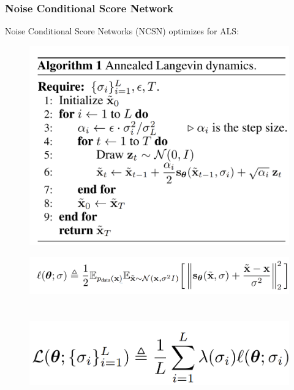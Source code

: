 \documentclass{beamer}
\begin{document}
\begin{frame}
    \frametitle{Noise Conditional Score Network}
    Noise Conditional Score Networks (NCSN) optimizes for ALS:
    \begin{figure}
        \centering
        \begin{minipage}{0.45\textwidth}
            \centering
            \includegraphics[width=1.2\textwidth]{images/ALD.png}
        \end{minipage}\hfill
        \begin{minipage}{0.45\textwidth}
            \centering
            \includegraphics[width=1.1\textwidth]{images/noisy_l.png}
            \\ \\ \\
            \includegraphics[width=.9\textwidth]{images/noisy_ads_L.png}
        \end{minipage}
    \end{figure}
\end{frame}
\end{document}
